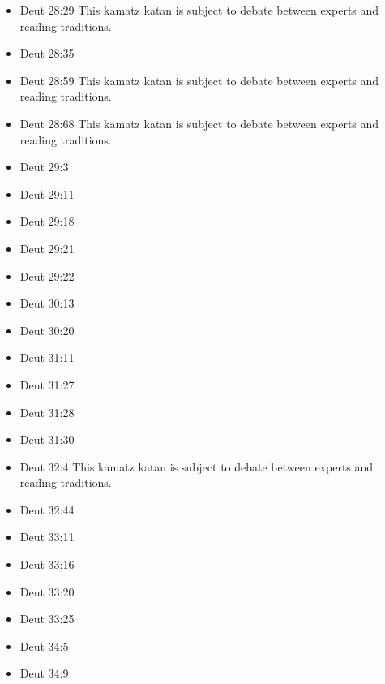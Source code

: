 \documentclass[14pt]{article}
\begin{document}
\begin{multicols}{2}
\begin{itemize}
\item Deut 28:29 This kamatz katan is subject to debate between experts and reading traditions.

\item Deut 28:35

\item Deut 28:59 This kamatz katan is subject to debate between experts and reading traditions.

\item Deut 28:68 This kamatz katan is subject to debate between experts and reading traditions.

\item Deut 29:3

\item Deut 29:11

\item Deut 29:18

\item Deut 29:21

\item Deut 29:22

\item Deut 30:13

\item Deut 30:20

\item Deut 31:11

\item Deut 31:27

\item Deut 31:28

\item Deut 31:30

\item Deut 32:4 This kamatz katan is subject to debate between experts and reading traditions.

\item Deut 32:44

\item Deut 33:11

\item Deut 33:16

\item Deut 33:20

\item Deut 33:25

\item Deut 34:5

\item Deut 34:9

\end{itemize}
\end{multicols}
\end{document}
